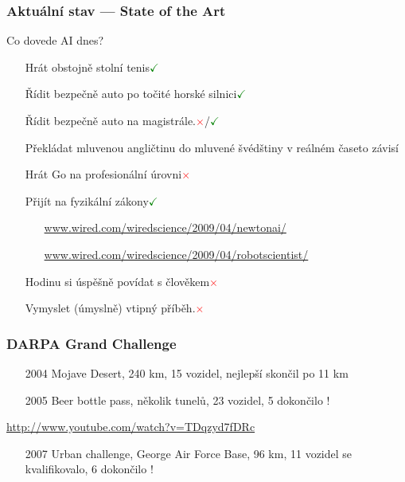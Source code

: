 \documentclass[red,handout,professionalfont]{beamer}
\theoremstyle{definition}
\newcommand{\0}{\mbox{${\bf 0}$}}
\newcommand{\yes}{\textcolor{green}{$\checkmark$}}
\newcommand{\no}{\textcolor{red}{$\times$}}
\begin{document}
\begin{frame}\frametitle{Aktuální stav --- State of the Art}
\begin{block}{}
\begin{center}
 Co dovede AI dnes?
\end{center}
\end{block}

\begin{itemize}
 \item[] Hrát obstojně stolní tenis\pause{}\hfill\yes\pause{}
 \item[] Řídit bezpečně auto po točité horské silnici\pause{}\hfill\yes\pause{}
 \item[] Řídit bezpečně auto na magistrále.\pause{}\hfill\no/\yes\pause{}
 \item[] Překládat mluvenou angličtinu do mluvené švédštiny v reálném čase\pause{}\hfill to závisí\pause{}
 \item[] Hrát Go na profesionální úrovni\pause{}\hfill\no\pause{}
 \item[] Přijít na fyzikální zákony\pause{}\hfill\yes\pause{}
 \begin{itemize}
   \item[] \url{www.wired.com/wiredscience/2009/04/newtonai/}
   \item[] \url{www.wired.com/wiredscience/2009/04/robotscientist/}
 \end{itemize}\pause{}
 \item[] Hodinu si úspěšně povídat s člověkem\pause{}\hfill\no\pause{}
 \item[] Vymyslet (úmyslně) vtipný příběh.\pause{}\hfill\no\pause{}
\end{itemize}
\end{frame}

\begin{frame}\frametitle{DARPA Grand Challenge}
\begin{itemize}
 \item[2004] Mojave Desert\pause{}, 240 km\pause{}, 15 vozidel\pause{}, nejlepší skončil po 11 km\pause{}
 \item[2005] Beer bottle pass\pause{}, několik tunelů\pause{}, 23 vozidel\pause{}, 5 dokončilo !\pause{}
\end{itemize}
\begin{block}{}
\url{http://www.youtube.com/watch?v=TDqzyd7fDRc}
\end{block}\pause{}
\begin{itemize}
 \item[2007] Urban challenge, George Air Force Base\pause{}, 96 km\pause{}, 11 vozidel se kvalifikovalo\pause{},  6 dokončilo !
\end{itemize}
\end{frame}
\end{document}
